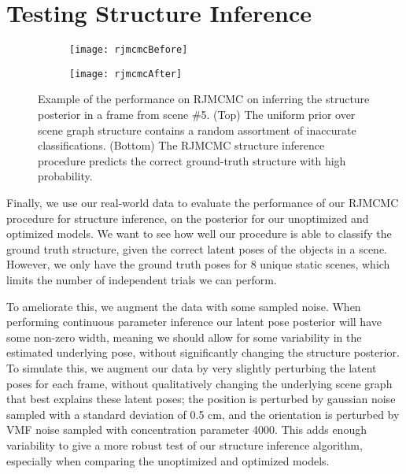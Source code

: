 \raggedbottom
\pagebreak
\flushbottom

\section{Testing Structure Inference}
\begin{figure}[H]
  \begin{subfigure}[b]{\textwidth}
    \centering
    \texttt{[image: rjmcmcBefore]}
  \end{subfigure}
  \begin{subfigure}[b]{\textwidth}
    \centering
    \texttt{[image: rjmcmcAfter]}
  \end{subfigure}
  \label{fig:rjmcmcExample}
  \caption{
    Example of the performance on RJMCMC on inferring the structure posterior in a frame from scene \#5.
    (Top) The uniform prior over scene graph structure contains a random assortment of inaccurate classifications.
    (Bottom) The RJMCMC structure inference procedure predicts the correct ground-truth structure with high probability.
  }
\end{figure}
Finally, we use our real-world data to evaluate the performance of our RJMCMC procedure for structure inference, on the posterior for our unoptimized and optimized models.
We want to see how well our procedure is able to classify the ground truth structure, given the correct latent poses of the objects in a scene.
However, we only have the ground truth poses for 8 unique static scenes, which limits the number of independent trials we can perform.

To ameliorate this, we augment the data with some sampled noise.
When performing continuous parameter inference our latent pose posterior will have some non-zero width, meaning we should allow for some variability in the estimated underlying pose, without significantly changing the structure posterior.
To simulate this, we augment our data by very slightly perturbing the latent poses for each frame, without qualitatively changing the underlying scene graph that best explains these latent poses; the position is perturbed by gaussian noise sampled with a standard deviation of 0.5 cm, and the orientation is perturbed by VMF noise sampled with concentration parameter 4000.
This adds enough variability to give a more robust test of our structure inference algorithm, especially when comparing the unoptimized and optimized models.

